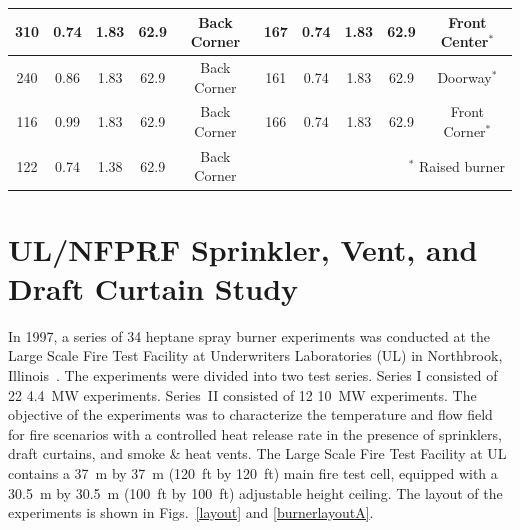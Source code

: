\begin{table}[h!]
\begin{center}
\begin{tabular}{|c|c|c|c|c||c|c|c|c|c|}
310     & 0.74      & 1.83          &  62.9      & Back Corner  & 167   & 0.74      & 1.83        &  62.9         & Front Center$^*$    \\ \hline
240     & 0.86      & 1.83          &  62.9      & Back Corner  & 161   & 0.74      & 1.83        &  62.9         & Doorway$^*$         \\ \hline
116     & 0.99      & 1.83          &  62.9      & Back Corner  & 166   & 0.74      & 1.83        &  62.9         & Front Corner$^*$    \\ \hline
122     & 0.74      & 1.38          &  62.9      & Back Corner  &  \multicolumn{5}{r|}{$^*$ Raised burner}                   \\ \hline
\end{tabular}
\end{center}
\label{Steckler_Table}
\end{table}


\clearpage





\section{UL/NFPRF Sprinkler, Vent, and Draft Curtain Study}
\label{UL_NFPRF_Description}

In 1997, a series of 34 heptane spray burner experiments was conducted at the Large Scale Fire Test Facility at Underwriters Laboratories
(UL) in Northbrook, Illinois~\cite{Sheppard:1}. The experiments were divided into two test series. Series I consisted of 22 4.4~MW experiments. Series~II consisted
of 12 10~MW experiments. The objective of the experiments was to characterize the temperature and flow field for fire
scenarios with a controlled heat release rate in the presence of sprinklers, draft curtains, and smoke \& heat vents.
The Large Scale Fire Test Facility at UL contains a 37~m by 37~m (120~ft by 120~ft) main fire test cell, equipped with a 30.5~m by 30.5~m (100~ft by
100~ft) adjustable height ceiling. The layout of the experiments is shown in Figs.~\ref{layout} and \ref{burnerlayoutA}.

